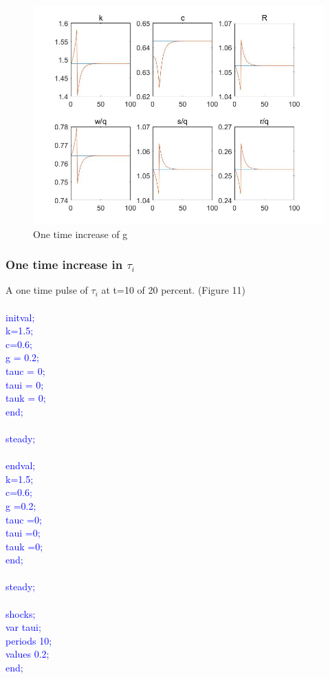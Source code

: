 \documentclass[a4paper,12pt]{scrartcl} %
\begin{document}
\begin{figure}[htbp!]
		\centering
			\includegraphics[width=0.8\linewidth]{fig10.jpg}
            \caption{One time increase of g}\label{10}
\end{figure}

\vspace{8cm}

\subsubsection{One time increase in $\tau_i$}

A one time pulse of $\tau_i$ at t=10 of 20 percent. (Figure 11)\\
\\
\textcolor{blue}{
initval;\\
k=1.5;\\
c=0.6;\\
g = 0.2;\\
tauc = 0;\\
taui = 0;\\
tauk = 0;\\
end;\\
\\
steady;\\
\\
endval;\\
k=1.5;\\
c=0.6;\\
g =0.2;\\
tauc =0;\\
taui =0;\\
tauk =0;\\
end;\\
\\
steady;\\
\\
shocks;\\
var taui;\\
periods 10;\\
values 0.2;\\
end;}\\
\end{document}
